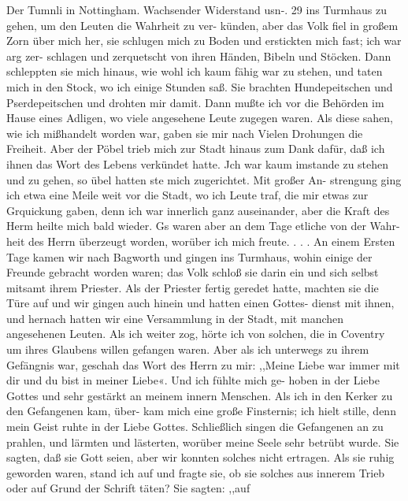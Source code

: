 Der Tumnli in Nottingham. Wachsender Widerstand usn-. 29
ins Turmhaus zu gehen, um den Leuten die Wahrheit zu ver-
künden, aber das Volk fiel in großem Zorn über mich her, sie
schlugen mich zu Boden und erstickten mich fast; ich war arg zer-
schlagen und zerquetscht von ihren Händen, Bibeln und Stöcken.
Dann schleppten sie mich hinaus, wie wohl ich kaum fähig war
zu stehen, und taten mich in den Stock, wo ich einige Stunden
saß. Sie brachten Hundepeitschen und Pserdepeitschen und drohten
mir damit. Dann mußte ich vor die Behörden im Hause eines
Adligen, wo viele angesehene Leute zugegen waren. Als diese
sahen, wie ich mißhandelt worden war, gaben sie mir nach
Vielen Drohungen die Freiheit. Aber der Pöbel trieb mich
zur Stadt hinaus zum Dank dafür, daß ich ihnen das Wort des
Lebens verkündet hatte. Jch war kaum imstande zu stehen und
zu gehen, so übel hatten ste mich zugerichtet. Mit großer An-
strengung ging ich etwa eine Meile weit vor die Stadt, wo ich
Leute traf, die mir etwas zur Grquickung gaben, denn ich war
innerlich ganz auseinander, aber die Kraft des Herm heilte mich
bald wieder. Gs waren aber an dem Tage etliche von der Wahr-
heit des Herrn überzeugt worden, worüber ich mich freute. . . .
An einem Ersten Tage kamen wir nach Bagworth und gingen
ins Turmhaus, wohin einige der Freunde gebracht worden waren;
das Volk schloß sie darin ein und sich selbst mitsamt ihrem
Priester. Als der Priester fertig geredet hatte, machten sie die
Türe auf und wir gingen auch hinein und hatten einen Gottes-
dienst mit ihnen, und hernach hatten wir eine Versammlung in
der Stadt, mit manchen angesehenen Leuten. Als ich weiter zog,
hörte ich von solchen, die in Coventry um ihres Glaubens willen
gefangen waren. Aber als ich unterwegs zu ihrem Gefängnis war,
geschah das Wort des Herrn zu mir: ,,Meine Liebe war immer
mit dir und du bist in meiner Liebe«. Und ich fühlte mich ge-
hoben in der Liebe Gottes und sehr gestärkt an meinem innern
Menschen. Als ich in den Kerker zu den Gefangenen kam, über-
kam mich eine große Finsternis; ich hielt stille, denn mein Geist
ruhte in der Liebe Gottes. Schließlich singen die Gefangenen
an zu prahlen, und lärmten und lästerten, worüber meine
Seele sehr betrübt wurde. Sie sagten, daß sie Gott seien, aber
wir konnten solches nicht ertragen. Als sie ruhig geworden
waren, stand ich auf und fragte sie, ob sie solches aus innerem
Trieb oder auf Grund der Schrift täten? Sie sagten: ,,auf

